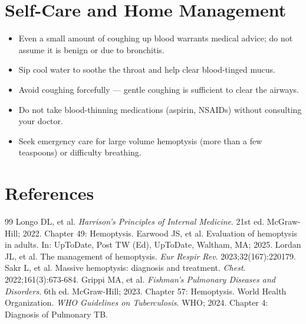 \section*{Self-Care and Home Management}
\begin{itemize}
  \item Even a small amount of coughing up blood warrants medical advice; do not assume it is benign or due to bronchitis.
  \item Sip cool water to soothe the throat and help clear blood-tinged mucus.
  \item Avoid coughing forcefully — gentle coughing is sufficient to clear the airways.
  \item Do not take blood-thinning medications (aspirin, NSAIDs) without consulting your doctor.
  \item Seek emergency care for large volume hemoptysis (more than a few teaspoons) or difficulty breathing.
\end{itemize}

\section*{References}

\begin{thebibliography}{99}
 Longo DL, et al. \emph{Harrison's Principles of Internal Medicine}. 21st ed. McGraw-Hill; 2022. Chapter 49: Hemoptysis.
 Earwood JS, et al. Evaluation of hemoptysis in adults. In: UpToDate, Post TW (Ed), UpToDate, Waltham, MA; 2025.
 Lordan JL, et al. The management of hemoptysis. \emph{Eur Respir Rev}. 2023;32(167):220179.
 Sakr L, et al. Massive hemoptysis: diagnosis and treatment. \emph{Chest}. 2022;161(3):673-684.
 Grippi MA, et al. \emph{Fishman's Pulmonary Diseases and Disorders}. 6th ed. McGraw-Hill; 2023. Chapter 57: Hemoptysis.
 World Health Organization. \emph{WHO Guidelines on Tuberculosis}. WHO; 2024. Chapter 4: Diagnosis of Pulmonary TB.
\end{thebibliography}
